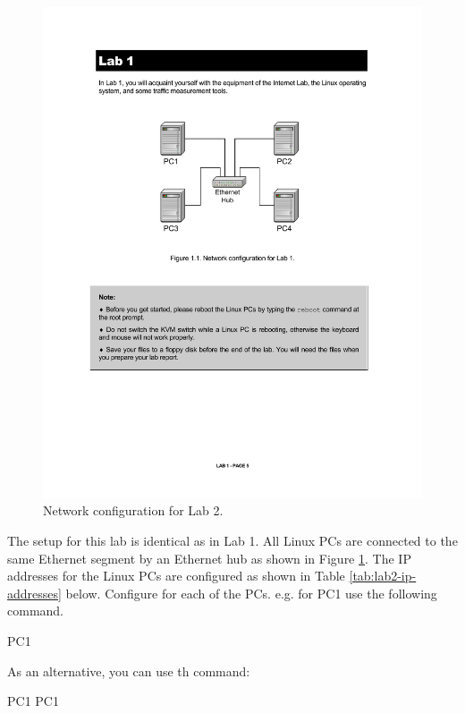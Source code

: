 \begin{figure}[h!t]
	\centering
	\includegraphics{graphics/lab1-network.pdf}	
	\caption{Network configuration for Lab 2.}
	\label{fig:lab2-network}
\end{figure}

The setup for this lab is identical as in Lab 1. All Linux PCs are connected to the same Ethernet segment by an Ethernet hub as shown in Figure \ref{fig:lab2-network}.
The IP addresses for the Linux PCs are configured as shown in Table \ref{tab:lab2-ip-addresses} below. Configure  for each of the PCs. e.g. for PC1 use the following command.

\begin{cmdblock}
	PC1%
\end{cmdblock}
As an alternative, you can use th  command:
\begin{cmdblock}
	PC1%
	PC1%
\end{cmdblock}

